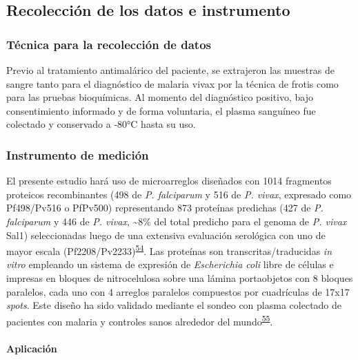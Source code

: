 \documentclass[]{article}
\let\oldparagraph\paragraph
\renewcommand{\paragraph}[1]{\oldparagraph{#1}\mbox{}}
\begin{document}
\subsection{Recolección de los datos e
instrumento}\label{recoleccion-de-los-datos-e-instrumento}

\subsubsection{Técnica para la recolección de
datos}\label{tecnica-para-la-recoleccion-de-datos}

Previo al tratamiento antimalárico del paciente, se extrajeron las
muestras de sangre tanto para el diagnóstico de malaria vivax por la
técnica de frotis como para las pruebas bioquímicas. Al momento del
diagnóstico positivo, bajo consentimiento informado y de forma
voluntaria, el plasma sanguíneo fue colectado y conservado a -80°C hasta
su uso.

\subsubsection{Instrumento de medición}\label{instrumento-de-medicion}

El presente estudio hará uso de microarreglos diseñados con 1014
fragmentos proteicos recombinantes (498 de \emph{P. falciparum} y 516 de
\emph{P. vivax}, expresado como Pf498/Pv516 o PfPv500) representando 873
proteínas predichas (427 de \emph{P. falciparum} y 446 de \emph{P.
vivax}, \textasciitilde{}8\% del total predicho para el genoma de
\emph{P. vivax} Sal1) seleccionadas luego de una extensiva evaluación
serológica con uno de mayor escala
(Pf2208/Pv2233)\textsuperscript{\protect\hyperlink{ref-Finney2014}{54}}.
Las proteínas son transcritas/traducidas \emph{in vitro} empleando un
sistema de expresión de \emph{Escherichia coli} libre de células e
impresas en bloques de nitrocelulosa sobre una lámina portaobjetos con 8
bloques paralelos, cada uno con 4 arreglos paralelos compuestos por
cuadrículas de 17x17 \emph{spots}. Este diseño ha sido validado mediante
el sondeo con plasma colectado de pacientes con malaria y controles
sanos alrededor del
mundo\textsuperscript{\protect\hyperlink{ref-King2015FOC}{55}}.

\paragraph{Aplicación}\label{aplicacion}
\end{document}

